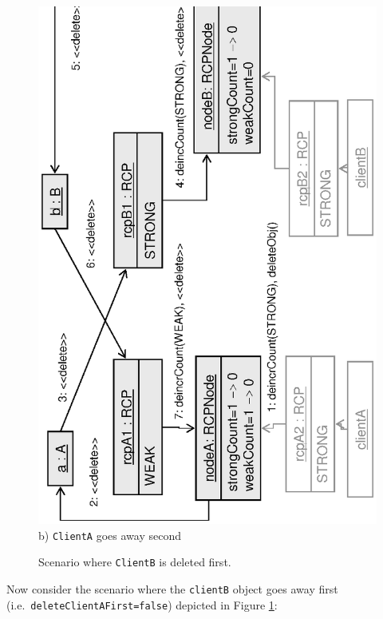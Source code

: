 \documentclass[pdf,ps2pdf,11pt]{SANDreport}
\begin{document}
{\begin{figure}
\begin{center}
\includegraphics*[angle=270,scale=0.65]{CircularRCP_A_B_ClientB_2}
\\[2ex] b) {}\texttt{ClientA} goes away second \\[3ex]
\end{center}
\caption{
\label{fig:CircularRCP_A_B_ClientB}
Scenario where {}\texttt{ClientB} is deleted first.  }
\end{figure}
\esinglespace}


Now consider the scenario where the {}\texttt{clientB} object goes
away first (i.e.\ {}\texttt{deleteClientAFirst=false}) depicted in
Figure {}\ref{fig:CircularRCP_A_B_ClientB}:
\end{document}
